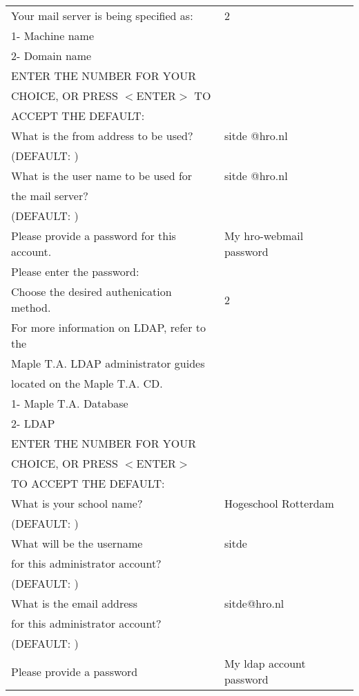 \begin{enumerate}
		\begin{tabular}{ | l | l |}
			   \hline
				 Your mail server is being specified as: & 2\\
				 1- Machine name & \\
				 2- Domain name & \\
				 ENTER THE NUMBER FOR YOUR  & \\
				 CHOICE, OR PRESS $<$ENTER$>$ TO 	& \\
				 ACCEPT THE DEFAULT: & \\
				 \hline
				 What is the from address to be used? & sitde @hro.nl\\
				 (DEFAULT: )& \\
			  \hline
			   What is the user name to be used for  & sitde @hro.nl\\
			   the mail server? & \\
			   (DEFAULT: ) & \\
			  \hline
			   Please provide a password for this account. & My hro-webmail password\\
			   Please enter the password: & \\
			  \hline
			   Choose the desired authenication method. & 2\\
			   For more information on LDAP, refer to the & \\
			   Maple T.A. LDAP administrator guides & \\
			   located on the Maple T.A. CD. & \\
			   1- Maple T.A. Database & \\
			   2- LDAP & \\
			   ENTER THE NUMBER FOR YOUR & \\
			   CHOICE, OR PRESS $<$ENTER$>$ & \\
			   TO ACCEPT THE DEFAULT: & \\
			   \hline
			   What is your school name? & Hogeschool Rotterdam\\
				 (DEFAULT: ) &\\
				 \hline
				 What will be the username & sitde\\
				 for this administrator account? &\\
				 (DEFAULT: )& \\
				 \hline
				 What is the email address & sitde@hro.nl\\
				 for this administrator account? & \\
				 (DEFAULT: ) &\\
				 \hline
				 Please provide a password & My ldap account password\\

\end{tabular}
\end{enumerate}

